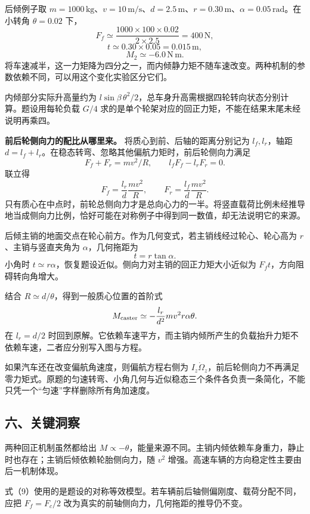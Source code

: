 \documentclass[12pt,a4paper,UTF8]{ctexart}
\begin{document}
后倾例子取
\(m=1000\,\mathrm{kg}\)、\(v=10\,\mathrm{m/s}\)、\(d=2.5\,\mathrm m\)、\(r=0.30\,\mathrm m\)、\(\alpha=0.05\,\mathrm{rad}\)。在小转角
\(\theta=0.02\) 下， \[
F_f\simeq\frac{1000\times100\times0.02}{2\times2.5}=400\,\mathrm N,
\] \[
t\simeq0.30\times0.05=0.015\,\mathrm m,
\] \[
M_2\simeq-6.0\,\mathrm{N\,m}.
\]
将车速减半，这一力矩降为四分之一，而内倾静力矩不随车速改变。两种机制的参数依赖不同，可以用这个变化实验区分它们。

内倾部分实际升高量约为
\(l\sin\beta\,\theta^2/2\)，总车身升高需根据四轮转向状态分别计算。题设用每轮负载
\(G/4\) 求的是单个轮架对应的回正力矩，不能在结果末尾未经说明再乘四。

\textbf{前后轮侧向力的配比从哪里来。} 将质心到前、后轴的距离分别记为
\(l_f,l_r\)，轴距
\(d=l_f+l_r\)。在稳态转弯、忽略其他偏航力矩时，前后轮侧向力满足 \[
F_f+F_r=mv^2/R,
\qquad l_fF_f-l_rF_r=0.
\] 联立得 \[
F_f=\frac{l_r}{d}\frac{mv^2}{R},
\qquad F_r=\frac{l_f}{d}\frac{mv^2}{R}.
\]
只有质心在中点时，前轮总侧向力才是总向心力的一半。将竖直载荷比例未经推导地当成侧向力比例，恰好可能在对称例子中得到同一数值，却无法说明它的来源。

后倾主销的地面交点在轮心前方。作为几何变式，若主销线经过轮心、轮心高为
\(r\)、主销与竖直夹角为 \(\alpha\)，几何拖距为 \[
t=r\tan\alpha.
\] 小角时
\(t\simeq r\alpha\)，恢复题设近似。侧向力对主销的回正力矩大小近似为
\(F_ft\)，方向阻碍转向角增大。

结合 \(R\simeq d/\theta\)，得到一般质心位置的首阶式 \[
M_{\rm caster}\simeq-\frac{l_r}{d^2}mv^2r\alpha\theta.
\] 在 \(l_r=d/2\)
时回到原解。它依赖车速平方，而主销内倾所产生的负载抬升力矩不依赖车速，二者应分别写入图与方程。

如果汽车还在改变偏航角速度，则偏航方程右侧为
\(I_z\dot\Omega_z\)，前后轮侧向力不再满足零力矩式。原题的匀速转弯、小角几何与近似稳态三个条件各负责一条简化，不能只凭一个``匀速''字样删除所有角加速度。

\subsection{六、关键洞察}\label{ux516dux5173ux952eux6d1eux5bdf}

两种回正机制虽然都给出
\(M\propto-\theta\)，能量来源不同。主销内倾依赖车身重力，静止时也存在；主销后倾依赖轮胎侧向力，随
\(v^2\) 增强。高速车辆的方向稳定性主要由后一机制体现。

式（9）使用的是题设的对称等效模型。若车辆前后轴侧偏刚度、载荷分配不同，应把
\(F_f=F_c/2\) 改为真实的前轴侧向力，几何拖距的推导仍不变。
\end{document}
